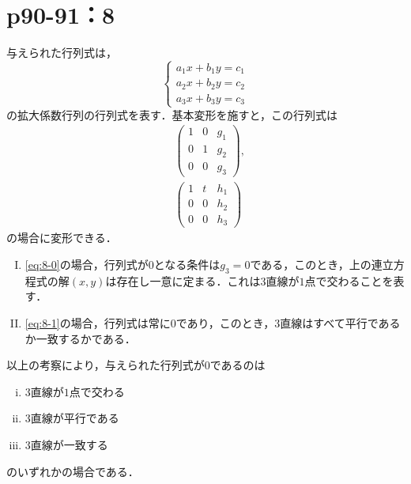 \documentclass[a4paper,10pt,fleqn]{ltjsarticle}
\begin{document}
\newpage


\section*{p90-91：8}

\begin{tleftbar}
    与えられた行列式は，
    \[
        \begin{cases}
            a_1 x + b_1 y =c_1 \\
            a_2 x + b_2 y =c_2 \\
            a_3 x + b_3 y =c_3
        \end{cases}
    \]
    の拡大係数行列の行列式を表す．基本変形を施すと，この行列式は
    \begin{align}
         & \begin{pmatrix}
               1 & 0 & g_1 \\
               0 & 1 & g_2 \\
               0 & 0 & g_3
           \end{pmatrix}
        \label{eq:8-0}
        ,                 \\
         & \begin{pmatrix}
               1 & t & h_1 \\
               0 & 0 & h_2 \\
               0 & 0 & h_3
           \end{pmatrix}
        \label{eq:8-1}
    \end{align}
    の場合に変形できる．

    \begin{enumerate}[(I)]
        \item \eqref{eq:8-0}の場合，行列式が$0$となる条件は$g_3 =0$である，このとき，上の連立方程式の解$(x,y)$は存在し一意に定まる．これは$3$直線が$1$点で交わることを表す．
        \item \eqref{eq:8-1}の場合，行列式は常に$0$であり，このとき，3直線はすべて平行であるか一致するかである．
    \end{enumerate}

    以上の考察により，与えられた行列式が$0$であるのは
    \begin{enumerate}[(i)]
        \item 3直線が$1$点で交わる
        \item 3直線が平行である
        \item 3直線が一致する
    \end{enumerate}
    のいずれかの場合である．
\end{tleftbar}
\end{document}
